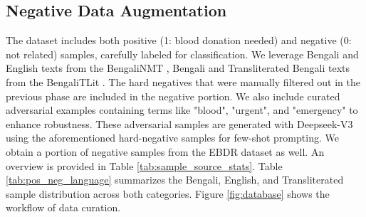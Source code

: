 \documentclass[11pt]{article}
\begin{document}
\subsection{Negative Data Augmentation}
The dataset includes both positive (1: blood donation needed) and negative (0: not related) samples, carefully labeled for classification. We leverage Bengali and English texts from the BengaliNMT \cite{acl1hasan-etal-2020-low}, Bengali and Transliterated Bengali texts from the BengaliTLit \cite{fahim2024banglatlit}. The hard negatives that were manually filtered out in the previous phase are included in the negative portion. We also include curated adversarial examples containing terms like "blood", "urgent", and "emergency" to enhance robustness. These adversarial samples are generated with Deepseek-V3 using the aforementioned hard-negative samples for few-shot prompting. We obtain a portion of negative samples from the EBDR dataset as well. An overview is provided in Table \ref{tab:sample_source_stats}. Table \ref{tab:pos_neg_language} summarizes the Bengali, English, and Transliterated sample distribution across both categories. Figure \ref{fig:database} shows the workflow of data curation. 



\begin{table}[t]
\centering
\caption{Sample distribution across different languages}

\label{tab:pos_neg_language}
\end{table}
\end{document}
